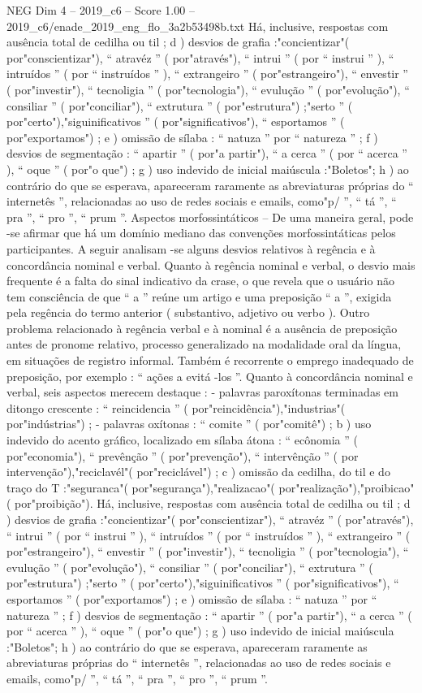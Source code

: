 \begin{textsample}{NEG Dim 4 – 2019\_c6 – Score 1.00 – 2019\_c6/enade\_2019\_eng\_flo\_3a2b53498b.txt}
Há, inclusive, respostas com ausência total de cedilha ou til ; d ) desvios de grafia :"concientizar"( por"conscientizar"), “ atravéz ” ( por"através"), “ intrui ” ( por “ instrui ” ), “ intruídos ” ( por “ instruídos ” ), “ extrangeiro ” ( por"estrangeiro"), “ envestir ” ( por"investir"), “ tecnoligia ” ( por"tecnologia"), “ evulução ” ( por"evolução"), “ consiliar ” ( por"conciliar"), “ extrutura ” ( por"estrutura") ;"serto ” ( por"certo"),"siguinificativos ” ( por"significativos"), “ esportamos ” ( por"exportamos") ; e ) omissão de sílaba : “ natuza ” por “ natureza ” ; f ) desvios de segmentação : “ apartir ” ( por"a partir"), “ a cerca ” ( por “ acerca ” ), “ oque ” ( por"o que") ; g ) uso indevido de inicial maiúscula :"Boletos"; h ) ao contrário do que se esperava, apareceram raramente as abreviaturas próprias do “ internetês ”, relacionadas ao uso de redes sociais e emails, como"p/ ”, “ tá ”, “ pra ”, “ pro ”, “ prum ”.
Aspectos morfossintáticos – De uma maneira geral, pode -se afirmar que há um domínio mediano das convenções morfossintáticas pelos participantes.
A seguir analisam -se alguns desvios relativos à regência e à concordância nominal e verbal.
Quanto à regência nominal e verbal, o desvio mais frequente é a falta do sinal indicativo da crase, o que revela que o usuário não tem consciência de que “ a ” reúne um artigo e uma preposição “ a ”, exigida pela regência do termo anterior ( substantivo, adjetivo ou verbo ).
Outro problema relacionado à regência verbal e à nominal é a ausência de preposição antes de pronome relativo, processo generalizado na modalidade oral da língua, em situações de registro informal.
Também é recorrente o emprego inadequado de preposição, por exemplo : “ ações a evitá -los ”.
Quanto à concordância nominal e verbal, seis aspectos merecem destaque : - palavras paroxítonas terminadas em ditongo crescente : “ reincidencia ” ( por"reincidência"),"industrias"( por"indústrias") ; - palavras oxítonas : “ comite ” ( por"comitê") ; b ) uso indevido do acento gráfico, localizado em sílaba átona : “ ecônomia ” ( por"economia"), “ prevênção ” ( por"prevenção"), “ intervênção ” ( por intervenção"),"reciclavél"( por"reciclável") ; c ) omissão da cedilha, do til e do traço do T :"seguranca"( por"segurança"),"realizacao"( por"realização"),"proibicao"( por"proibição").
Há, inclusive, respostas com ausência total de cedilha ou til ; d ) desvios de grafia :"concientizar"( por"conscientizar"), “ atravéz ” ( por"através"), “ intrui ” ( por “ instrui ” ), “ intruídos ” ( por “ instruídos ” ), “ extrangeiro ” ( por"estrangeiro"), “ envestir ” ( por"investir"), “ tecnoligia ” ( por"tecnologia"), “ evulução ” ( por"evolução"), “ consiliar ” ( por"conciliar"), “ extrutura ” ( por"estrutura") ;"serto ” ( por"certo"),"siguinificativos ” ( por"significativos"), “ esportamos ” ( por"exportamos") ; e ) omissão de sílaba : “ natuza ” por “ natureza ” ; f ) desvios de segmentação : “ apartir ” ( por"a partir"), “ a cerca ” ( por “ acerca ” ), “ oque ” ( por"o que") ; g ) uso indevido de inicial maiúscula :"Boletos"; h ) ao contrário do que se esperava, apareceram raramente as abreviaturas próprias do “ internetês ”, relacionadas ao uso de redes sociais e emails, como"p/ ”, “ tá ”, “ pra ”, “ pro ”, “ prum ”.

\end{textsample}

